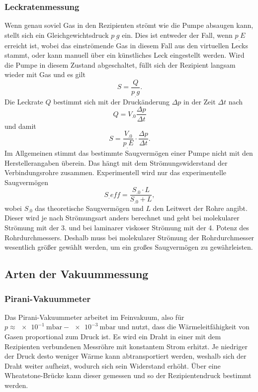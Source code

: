 \subsubsection{Leckratenmessung}

Wenn genau soviel Gas in den Rezipienten strömt wie die Pumpe absaugen kann, stellt sich ein Gleichgewichtsdruck $p_.g$ ein. Dies ist entweder der Fall, wenn $p_.E$ erreicht ist, wobei das einströmende Gas in diesem Fall aus den virtuellen Lecks stammt, oder kann manuell über ein künstliches Leck eingestellt werden. \newline 
Wird die Pumpe in diesem Zustand abgeschaltet, füllt sich der Rezipient langsam wieder mit Gas und es gilt 
\[
S=\frac{Q}{p_.g}\text{.}
\]
Die Leckrate $Q$ bestimmt sich mit der Druckänderung $\Delta p$ in der Zeit $\Delta t$ nach
\[
Q=V_.0\frac{\Delta p}{\Delta t}
\]
und damit
\begin{equation}
S=\frac{V_.0}{p_.E}\cdot\frac{\Delta p}{\Delta t}\text{.}\label{eq:S}
\end{equation}
\newline\newline
Im Allgemeinen stimmt das bestimmte Saugvermögen einer Pumpe nicht mit den Herstellerangaben überein.
Das hängt mit dem Strömungswiderstand der Verbindungsrohre zusammen.
Experimentell wird nur das experimentelle Saugvermögen
\begin{equation}
S_.{eff}=\frac{S_.0\cdot L}{S_.0+L},
\end{equation}
wobei $S_.0$ das theoretische Saugvermögen und $L$ den Leitwert der Rohre angibt.
Dieser wird je nach Strömungsart anders berechnet und geht bei molekularer Strömung mit der 3. und bei laminarer viskoser Strömung mit der 4. Potenz des Rohrdurchmessers.
Deshalb muss bei molekularer Strömung der Rohrdurchmesser wesentlich größer gewählt werden, um ein großes Saugvermögen zu gewährleisten.

\subsection{Arten der Vakuummessung}

\subsubsection{Pirani-Vakuummeter}

Das Pirani-Vakuummeter arbeitet im Feinvakuum, also für $p\approx \SI{e-1}{\milli\bar} - \SI{e-3}{\milli\bar}$ und nutzt, dass die Wärmeleitfähigkeit von Gasen proportional zum Druck ist. Es wird ein Draht in einer mit dem Rezipienten verbundenen Messröhre mit konstantem Strom erhitzt. Je niedriger der Druck desto weniger Wärme kann abtransportiert werden, weshalb sich der Draht weiter aufheizt, wodurch sich sein Widerstand erhöht. Über eine Wheatstone-Brücke kann dieser gemessen und so der Rezipientendruck bestimmt werden.\cite{Jena}

